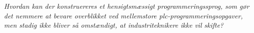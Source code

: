 \noindent\textit{Hvordan kan der konstruereres et hensigtsmæssigt programmeringssprog, som gør det nemmere at bevare overblikket ved mellemstore \gls{plc}-programmeringsopgaver, men stadig ikke bliver så omstændigt, at industriteknikere ikke vil skifte?}











